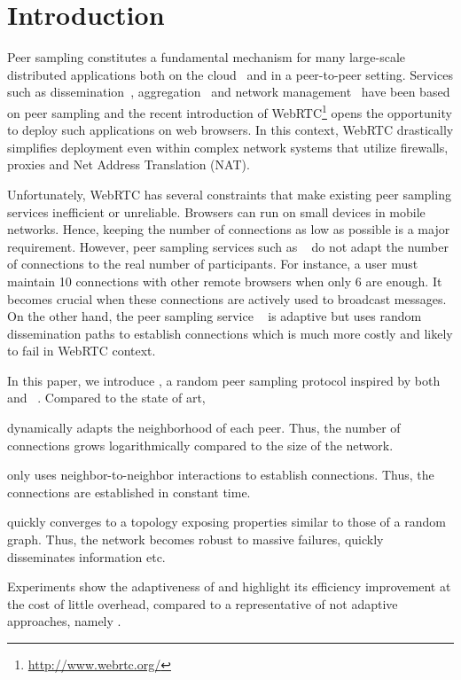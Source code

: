 
\section{Introduction}

Peer sampling constitutes a fundamental mechanism for many large-scale
distributed applications both on the
cloud~\cite{decandia2007dynamo} and in a peer-to-peer
setting. Services such as dissemination~\cite{eugster2003lightweight,
  tolgyeski2009adaptive}, aggregation~\cite{jelasity2004epidemic} and
network management~\cite{jelasity2009tman, voulgaris2005epidemic} have
been based on peer sampling and the recent introduction of
WebRTC\footnote{\url{http://www.webrtc.org/}} opens the opportunity to
deploy such applications on web browsers.
In this context, WebRTC drastically simplifies deployment even within complex
network systems that utilize firewalls, proxies and Net Address Translation
(NAT).

Unfortunately, WebRTC has several constraints that make existing peer sampling
services inefficient or unreliable. Browsers can run on small devices in
mobile networks. Hence, keeping the number of connections as low as possible is
a major requirement. However, peer sampling services such as
\CYCLON~\cite{voulgaris2005cyclon} do not adapt the number of connections to the
real number of participants. For instance, a user must maintain 10 connections
with other remote browsers when only 6 are enough. It becomes crucial when these
connections are actively used to broadcast messages. On the other hand, the peer
sampling service \SCAMP~\cite{ganesh2003peer} is adaptive but uses random
dissemination paths to establish connections which is much more costly and
likely to fail in WebRTC context. 

In this paper, we introduce \SPRAY, a random peer sampling protocol inspired by
both \SCAMP~\cite{ganesh2003peer}
and \CYCLON~\cite{voulgaris2005cyclon}. Compared to the state of art,
\begin{inparaenum}[(i)]
\item \SPRAY dynamically adapts the neighborhood of each peer. Thus, the number
  of connections grows logarithmically compared to the size of the network.
\item \SPRAY only uses neighbor-to-neighbor interactions to establish
  connections. Thus, the connections are established in constant time.
\item \SPRAY quickly converges to a topology exposing properties similar to
  those of a random graph. Thus, the network becomes robust to massive
  failures, quickly disseminates information etc.
\item Experiments show the adaptiveness of \SPRAY and highlight its efficiency
  improvement at the cost of little overhead, compared to a representative of
  not adaptive approaches, namely \CYCLON.
\end{inparaenum}

